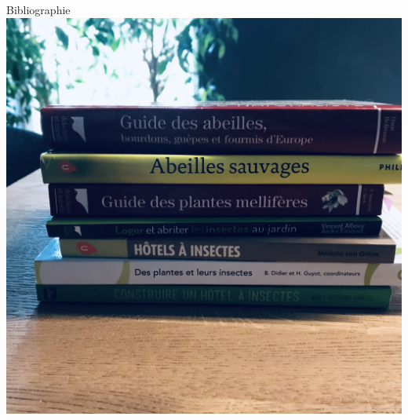 \documentclass{beamer}
\begin{document}
\begin{frame}{Bibliographie}
        \includegraphics[scale=0.09]{./exemples/biblio.jpg}
\end{frame}
\end{document}
